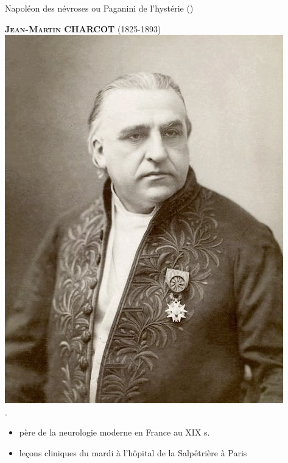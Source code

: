 \begin{frame}{\og{}Napoléon des névroses\fg{} ou \og{}Paganini de l'hystérie\fg{} {\small(\hypersetup{citecolor=yellow}\cite{marmion2015freud})}}

\textsc{\textcolor{deepblue}{\textbf{Jean-Martin CHARCOT}} (1825-1893)}
\hbox{\hspace{10.3em} \includegraphics[scale=0.06]{pic/Jean-Martin_Charcot.jpg}}\\\hbox{.}
\begin{itemize}
\item père de la neurologie moderne en France au XIX\ieme{} s. 
\item leçons cliniques du mardi à l'hôpital de la Salpêtrière à Paris \\

\end{itemize}
\end{frame}
